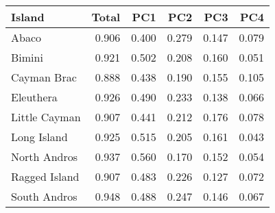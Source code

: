 
\begin{tabular}{lrrrrr}
\toprule
Island & Total & PC1 & PC2 & PC3 & PC4\\
\midrule
Abaco & 0.906 & 0.400 & 0.279 & 0.147 & 0.079\\
Bimini & 0.921 & 0.502 & 0.208 & 0.160 & 0.051\\
Cayman Brac & 0.888 & 0.438 & 0.190 & 0.155 & 0.105\\
Eleuthera & 0.926 & 0.490 & 0.233 & 0.138 & 0.066\\
Little Cayman & 0.907 & 0.441 & 0.212 & 0.176 & 0.078\\
Long Island & 0.925 & 0.515 & 0.205 & 0.161 & 0.043\\
North Andros & 0.937 & 0.560 & 0.170 & 0.152 & 0.054\\
Ragged Island & 0.907 & 0.483 & 0.226 & 0.127 & 0.072\\
South Andros & 0.948 & 0.488 & 0.247 & 0.146 & 0.067\\
\bottomrule
\end{tabular}